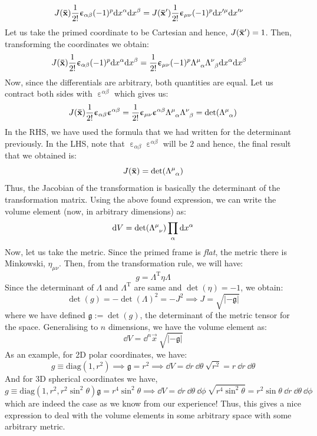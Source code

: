 \begin{align*}
    J(\vb{\bar{x}})\frac{1}{2!} \upepsilon_{\alpha\beta}(-1)^p \dd x^\alpha \dd x^\beta &= J(\vb{\bar{x}}') \frac{1}{2!} \upepsilon_{\mu\nu}(-1)^p \dd x'^\mu \dd x'^\nu
\end{align*}
Let us take the primed coordinate to be Cartesian and hence, $J(\vb{\bar{x}}') =1$. Then, transforming the coordinates we obtain:
\begin{align*}
    J(\fvec{x})\frac{1}{2!} \upepsilon_{\alpha\beta}(-1)^p \dd x^\alpha \dd x^\beta &= \frac{1}{2!} \upepsilon_{\mu\nu}(-1)^p \trmat{\mu}{\alpha}\trmat{\nu}{\beta}\dd x^\alpha \dd x^\beta
\end{align*}
Now, since the differentials are arbitrary, both quantities are equal. Let us contract both sides with $\upepsilon^{\alpha\beta}$ which gives us:
$$J(\fvec{x}) \frac{1}{2!} \upepsilon_{\alpha\beta}\upepsilon^{\alpha\beta} = \frac{1}{2!}\upepsilon_{\mu\nu}\upepsilon^{\alpha\beta}\trmat{\mu}{\alpha}\trmat{\nu}{\beta}=\det(\trmat{\mu}{\alpha})$$
In the RHS, we have used the formula that we had written for the determinant previously. In the LHS, note that $\upepsilon_{\alpha\beta}\upepsilon^{\alpha\beta} $ will be $2$ and hence, the final result that we obtained is:
$$J(\fvec{x}) = \det(\trmat{\mu}{\alpha})$$
Thus, the Jacobian of the transformation is basically the determinant of the transformation matrix. Using the above found expression, we can write the volume element (now, in arbitrary dimensions) as:
$$\dd V = \det(\trmat{\mu}{\nu}) \prod\limits_{\alpha}\dd x^\alpha $$
Now, let us take the metric. Since the primed frame is \textit{flat}, the metric there is Minkowski, $\eta_{\mu\nu}$. Then, from the transformation rule, we will have:
$$g = \Lambda^{\mathrm{T}}\eta \Lambda$$
Since the determinant of $\Lambda$ and $\Lambda^{\mathrm{T}}$ are same and $\det(\eta)=-1$, we obtain:
$$\det(g) = -\det(\Lambda)^2 = -J^2 \implies J = \sqrt{|-\mathfrak{g}|}$$
where we have defined $\mathfrak{g}:= \det(g)$, the determinant of the metric tensor for the space. Generalising to $n$ dimensions, we have the volume element as:
$$\dd V = \dd^n \vec{x} \ \sqrt{|-\mathfrak{g}|}$$
As an example, for 2D polar coordinates, we have: $$g\equiv  \mathrm{diag}(1, r^2)\implies \mathfrak{g} = r^2 \implies \dd V = \dd r \ \dd \theta \ \sqrt{r^2} =r \ \dd r\ \dd \theta$$ And for 3D  spherical coordinates we have, $$g\equiv  \mathrm{diag}(1, r^2, r^2\sin^2\theta)\mathfrak{g} = r^4\sin^2\theta \implies \dd V = \dd r \ \dd \theta\ \dd \phi \ \sqrt{r^4\sin^2\theta} =r^2 \sin\theta\ \dd r \ \dd \theta\ \dd \phi $$
which are indeed the case as we know from our experience! Thus, this gives a nice expression to deal with the volume elements in some arbitrary space with some arbitrary metric. 